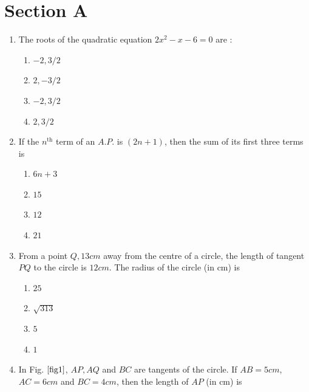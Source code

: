 \documentclass[journal,12pt,twocolumn]{IEEEtran}
\renewcommand\thesection{\arabic{section}}
\begin{document}
\section{Section A}
\renewcommand{\theequation}{\theenumi}
\begin{enumerate}[label=\thesection.\arabic*.,ref=\thesection.\theenumi]
\item The roots of the  quadratic equation $2x^2-x-6=0$ are :
 \begin{enumerate}
    \item $-2,3/2$\\
    \item $2, -3/2$\\
    \item $-2, 3/2$\\
    \item $2, 3/2$\\
 \end{enumerate} 
\item If the  $n^{\text{th}}$ term of an $A.P.$ is $(2n+ 1)$, then the sum of its first three terms is
 \begin{enumerate}
    \item $6n + 3$\\
    \item $15$ \\
    \item $12$\\
    \item $21$ \\
 \end{enumerate}
\item From a point $Q, 13 cm$ away from the centre of a circle, the length of tangent $PQ$ to the circle is $12 cm$. The radius of the circle (in cm)
is \\
 \begin{enumerate}
    \item $25$\\
    \item $\sqrt{313}$\\
    \item $5$\\
    \item $1$ \\
 \end{enumerate}
\item In Fig. $\ref{fig1}$, $AP, AQ$ and $BC$ are tangents of the circle. If $AB=5cm$, $AC=6cm$ and $BC=4 cm$, then the length of $AP$ (in cm) is \\

\end{enumerate}
\end{document}
